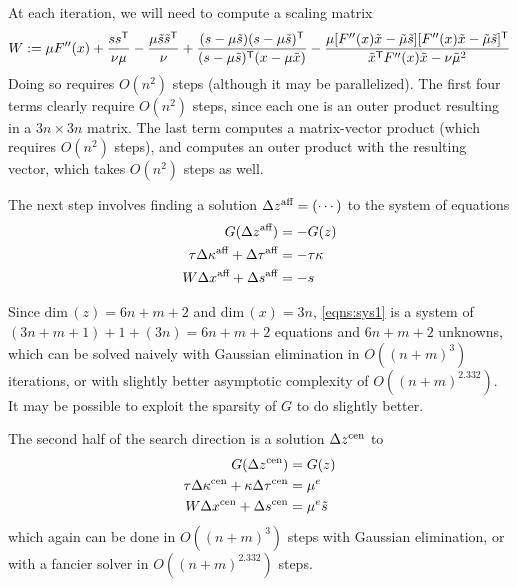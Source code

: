 \documentclass[twoside]{article}
\begin{document}
\begin{lproof}
    At each iteration, 
    we  will need to compute a scaling matrix
    \begin{equation}
        W :=
            \mu F''(x) + \frac{s s^{\sf T}}{\nu \mu}
            - \frac{\mu \tilde s \tilde s^{\sf T}}{\nu}
            + \frac{(s- \mu\tilde s)(s-\mu\tilde s)^{\sf T}}
                    {(s-\mu\tilde s)^{\sf T} (x - \mu \tilde x) }
            - \frac{\mu [ F''(x) \tilde x - \tilde \mu \tilde s]
                [ F''(x) \tilde x - \tilde \mu \tilde s]^{\sf T}}
                { \tilde x^{\sf T} F''(x) \tilde x - \nu \tilde \mu^2}
        \label{eq:scalemat}
    \end{equation}
    Doing so requires $O(n^2)$ steps (although it may be parallelized). 
    The first four terms clearly require $O(n^2)$ steps, since each one is an outer product resulting in a $3n \times 3n$ matrix. 
    The last term computes a matrix-vector product (which requires $O(n^2)$ steps), and computes an outer product with the resulting vector, which takes $O(n^2)$ steps as well. 
    
    The next step involves finding a solution $\Delta {z}^{\text{aff}} = (\cdots)$
    to the system of equations
    \begin{subequations} \label{eqns:sys1}
    \begin{align}
        G(\Delta {z}^{\text{aff}}) &= -G(z) \\
        \tau \Delta {\kappa}^{\text{aff}} + \Delta {\tau}^{\text{aff}} &= - \tau \kappa \\
        W \Delta {x}^{\text{aff}} + \Delta {s}^{\text{aff}} &= -s
    \end{align}
    \end{subequations}
    
    Since $\mathrm{dim}\,(z) = 6n+m+2$ and $\mathrm{dim}\,(x) = 3n$,
    \eqref{eqns:sys1} is a system of $(3n + m + 1) + 1 + (3n) = 6n + m + 2$ equations
    and $6n + m + 2$ unknowns,
    which can be solved naively with Gaussian elimination in $O((n+m)^3)$ iterations,
    or with slightly better asymptotic complexity of
    $O((n+m)^{2.332})$.
    It may be possible to exploit the sparsity of $G$ to do slightly better. 
    
    The second half of the search direction is a solution $\Delta {z}^{\text{cen}}$ to 
    \begin{subequations}\label{eqns:sys2}
    \begin{align}
        G(\Delta {z}^{\text{cen}}) &= G(z) \\
        \tau \Delta {\kappa}^{\text{cen}} + \kappa \Delta {\tau}^{\text{cen}} &= \mu^e \\
        W \Delta {x}^{\text{cen}} + \Delta {s}^{\text{cen}} &= \mu^e \tilde s
    \end{align}
    \end{subequations}
    which again can be done in $O((n+m)^3)$ steps with Gaussian elimination, or
    with a fancier solver in $O((n+m)^2.332)$ steps. 
    

\end{lproof}
\end{document}
